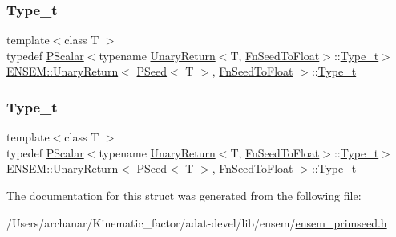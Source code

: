 \subsubsection{\texorpdfstring{Type\_t}{Type\_t}\hspace{0.1cm}{\footnotesize\ttfamily [2/3]}}
{\footnotesize\ttfamily template$<$class T $>$ \\
typedef \mbox{\hyperlink{classENSEM_1_1PScalar}{P\+Scalar}}$<$typename \mbox{\hyperlink{structENSEM_1_1UnaryReturn}{Unary\+Return}}$<$T, \mbox{\hyperlink{structENSEM_1_1FnSeedToFloat}{Fn\+Seed\+To\+Float}}$>$\+::\mbox{\hyperlink{structENSEM_1_1UnaryReturn_3_01PSeed_3_01T_01_4_00_01FnSeedToFloat_01_4_a0162324945d4cff5d69aa1ee87641522}{Type\+\_\+t}}$>$ \mbox{\hyperlink{structENSEM_1_1UnaryReturn}{E\+N\+S\+E\+M\+::\+Unary\+Return}}$<$ \mbox{\hyperlink{classENSEM_1_1PSeed}{P\+Seed}}$<$ T $>$, \mbox{\hyperlink{structENSEM_1_1FnSeedToFloat}{Fn\+Seed\+To\+Float}} $>$\+::\mbox{\hyperlink{structENSEM_1_1UnaryReturn_3_01PSeed_3_01T_01_4_00_01FnSeedToFloat_01_4_a0162324945d4cff5d69aa1ee87641522}{Type\+\_\+t}}}

\mbox{\label{structENSEM_1_1UnaryReturn_3_01PSeed_3_01T_01_4_00_01FnSeedToFloat_01_4_a0162324945d4cff5d69aa1ee87641522}} 
\subsubsection{\texorpdfstring{Type\_t}{Type\_t}\hspace{0.1cm}{\footnotesize\ttfamily [3/3]}}
{\footnotesize\ttfamily template$<$class T $>$ \\
typedef \mbox{\hyperlink{classENSEM_1_1PScalar}{P\+Scalar}}$<$typename \mbox{\hyperlink{structENSEM_1_1UnaryReturn}{Unary\+Return}}$<$T, \mbox{\hyperlink{structENSEM_1_1FnSeedToFloat}{Fn\+Seed\+To\+Float}}$>$\+::\mbox{\hyperlink{structENSEM_1_1UnaryReturn_3_01PSeed_3_01T_01_4_00_01FnSeedToFloat_01_4_a0162324945d4cff5d69aa1ee87641522}{Type\+\_\+t}}$>$ \mbox{\hyperlink{structENSEM_1_1UnaryReturn}{E\+N\+S\+E\+M\+::\+Unary\+Return}}$<$ \mbox{\hyperlink{classENSEM_1_1PSeed}{P\+Seed}}$<$ T $>$, \mbox{\hyperlink{structENSEM_1_1FnSeedToFloat}{Fn\+Seed\+To\+Float}} $>$\+::\mbox{\hyperlink{structENSEM_1_1UnaryReturn_3_01PSeed_3_01T_01_4_00_01FnSeedToFloat_01_4_a0162324945d4cff5d69aa1ee87641522}{Type\+\_\+t}}}



The documentation for this struct was generated from the following file\+:\begin{DoxyCompactItemize}
\item 
/\+Users/archanar/\+Kinematic\+\_\+factor/adat-\/devel/lib/ensem/\mbox{\hyperlink{adat-devel_2lib_2ensem_2ensem__primseed_8h}{ensem\+\_\+primseed.\+h}}\end{DoxyCompactItemize}
